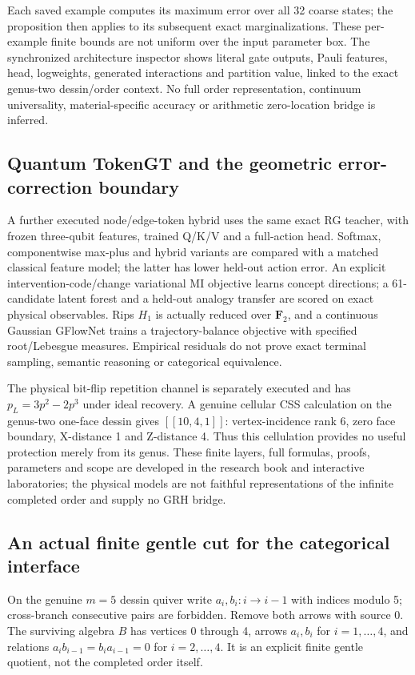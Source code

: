 Each saved example computes its maximum error over all 32 coarse states;
the proposition then applies to its subsequent exact marginalizations.
These per-example finite bounds are not uniform over the input parameter
box. The synchronized architecture inspector shows literal gate outputs,
Pauli features, head, logweights, generated interactions and partition
value, linked to the exact genus-two dessin/order context. No full order
representation, continuum universality, material-specific accuracy or
arithmetic zero-location bridge is inferred.

\subsection{Quantum TokenGT and the geometric error-correction boundary}
A further executed node/edge-token hybrid uses the same exact RG teacher,
with frozen three-qubit features, trained Q/K/V and a full-action head.
Softmax, componentwise max-plus and hybrid variants are compared with a
matched classical feature model; the latter has lower held-out action error.
An explicit intervention-code/change variational MI objective learns concept
directions; a 61-candidate latent forest and a held-out analogy transfer are
scored on exact physical observables. Rips $ H_1$ is actually reduced over
$\mathbf F_2$, and a continuous Gaussian GFlowNet trains a trajectory-balance
objective with specified root/Lebesgue measures. Empirical residuals do not
prove exact terminal sampling, semantic reasoning or categorical equivalence.

The physical bit-flip repetition channel is separately executed and has
$ p_L=3 p^2-2 p^3$ under ideal recovery. A genuine cellular CSS calculation on
the genus-two one-face dessin gives $[[10,4,1]]$: vertex-incidence rank 6,
zero face boundary, X-distance 1 and Z-distance 4. Thus this cellulation
provides no useful protection merely from its genus. These finite layers,
full formulas, proofs, parameters and scope are developed in the research
book and interactive laboratories; the physical models are not faithful
representations of the infinite completed order and supply no GRH bridge.

\subsection{An actual finite gentle cut for the categorical interface}
\label{rg:cut}
On the genuine $ m=5$ dessin quiver write
$ a_i,b_i:i\to i-1$ with indices modulo 5; cross-branch consecutive pairs
are forbidden. Remove both arrows with source 0. The surviving algebra $ B $
has vertices 0 through 4, arrows $ a_i,b_i $ for $ i=1,\ldots,4$, and relations
$ a_i b_{i-1}=b_i a_{i-1}=0$ for $ i=2,\ldots,4$. It is an explicit finite
gentle quotient, not the completed order itself.

